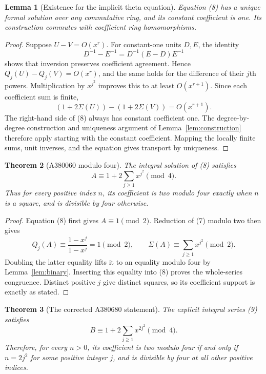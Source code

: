 \documentclass[11pt,a4paper]{article}
\newtheorem{theorem}{Theorem}[section]
\newtheorem{lemma}[theorem]{Lemma}
\theoremstyle{remark}
\begin{document}
\begin{lemma}[Existence for the implicit theta equation]\label{lem:thetaexist}
Equation (8) has a unique formal solution over any commutative ring, and
its constant coefficient is one. Its construction commutes with
coefficient ring homomorphisms.
\end{lemma}

\begin{proof}
Suppose $U-V=O(x^r)$. For constant-one units $D,E$, the identity
\[
 D^{-1}-E^{-1}=D^{-1}(E-D)E^{-1}
\]
shows that inversion preserves coefficient agreement. Hence
$Q_j(U)-Q_j(V)=O(x^r)$, and the same holds for the difference of their
$j$th powers. Multiplication by $x^{j^2}$ improves this to at least
$O(x^{r+1})$. Since each coefficient sum is finite,
\[
 (1+2\Sigma(U))-(1+2\Sigma(V))=O(x^{r+1}).
\]
The right-hand side of (8) always has constant coefficient one. The
degree-by-degree construction and uniqueness argument of
Lemma~\ref{lem:construction} therefore apply starting with the constant
coefficient. Mapping the locally finite sums, unit inverses, and the
equation gives transport by uniqueness.
\end{proof}

\begin{theorem}[A380060 modulo four]\label{thm:theta060}
The integral solution of (8) satisfies
\[
 A\equiv1+2\sum_{j\ge1}x^{j^2}\pmod4.
\]
Thus for every positive index $n$, its coefficient is two modulo four
exactly when $n$ is a square, and is divisible by four otherwise.
\end{theorem}

\begin{proof}
Equation (8) first gives $A\equiv1\pmod2$. Reduction of (7) modulo two
then gives
\[
 Q_j(A)\equiv\frac{1-x^j}{1-x^j}=1\pmod2,
 \qquad
 \Sigma(A)\equiv\sum_{j\ge1}x^{j^2}\pmod2.
\]
Doubling the latter equality lifts it to an equality modulo four by
Lemma~\ref{lem:binary}. Inserting this equality into (8) proves the
whole-series congruence. Distinct positive $j$ give distinct squares,
so its coefficient support is exactly as stated.
\end{proof}

\begin{theorem}[The corrected A380680 statement]\label{thm:theta680}
The explicit integral series (9) satisfies
\[
 B\equiv1+2\sum_{j\ge1}x^{2j^2}\pmod4.
\]
Therefore, for every $n>0$, its coefficient is two modulo four if and
only if $n=2j^2$ for some positive integer $j$, and is divisible by four
at all other positive indices.
\end{theorem}
\end{document}
